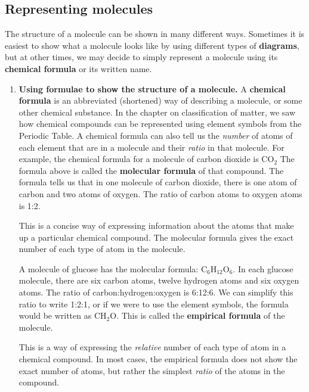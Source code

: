             \subsection{ Representing molecules}
            \nopagebreak
        \label{m38120*id307557}The structure of a molecule can be shown in many 
different ways. Sometimes it is easiest to show what a molecule looks like by 
using different types of \textbf{diagrams}, but at 
other times, we may decide to simply represent a molecule using its \textbf{chemical formula} or its written name.\par 
        \label{m38120*id307573}\begin{enumerate}[noitemsep, label=\textbf{\arabic*}. ] 
            \label{m38120*uid2}\item \textbf{Using formulae to show the structure of a 
molecule.}
A \textbf{chemical formula} is an abbreviated 
(shortened) way of describing a molecule, or some other chemical substance. In 
the chapter on classification of matter, we saw how chemical compounds can be 
represented using element symbols from the Periodic Table. A chemical formula 
can also tell us the \textsl{number} of atoms of 
each element that are in a molecule and their \textsl{ratio} in that molecule.
For example, the chemical formula for a molecule of carbon dioxide is
${\mathrm{CO}}_{2}$
The formula above is called the \textbf{molecular 
formula} of that compound. The formula tells us that in one molecule 
of carbon dioxide, there is one atom of carbon and two atoms of oxygen. The 
ratio of carbon atoms to oxygen atoms is 1:2.
\vspace{\rubberspace}\par
        \label{m38120*fhsst!!!underscore!!!id87}
  { \label{m38120*meaningfhsst!!!underscore!!!id87}
This is a concise way of expressing information about the atoms that make up a 
particular chemical compound. The molecular formula gives the exact number of 
each type of atom in the molecule. 
 } 

A molecule of glucose has the molecular formula:
${\mathrm{C}}_{6}{\mathrm{H}}_{12}{\mathrm{O}}_{6}$.
In each glucose molecule, there are six carbon atoms, twelve hydrogen atoms and 
six oxygen atoms. The ratio of carbon:hydrogen:oxygen is 6:12:6. We can simplify 
this ratio to write 1:2:1, or if we were to use the element symbols, the formula 
would be written as ${\mathrm{CH}}_{2}\mathrm{O}$. This is called the \textbf{empirical formula} of the molecule.
\vspace{\rubberspace}\par
        \label{m38120*fhsst!!!underscore!!!id93}
 { \label{m38120*meaningfhsst!!!underscore!!!id93}
This is a way of expressing the \textsl{relative} 
number of each type of atom in a chemical compound. In most cases, the empirical 
formula does not show the exact number of atoms, but rather the simplest 
\textsl{ratio} of the atoms in the compound. 
 } 


\end{enumerate}
